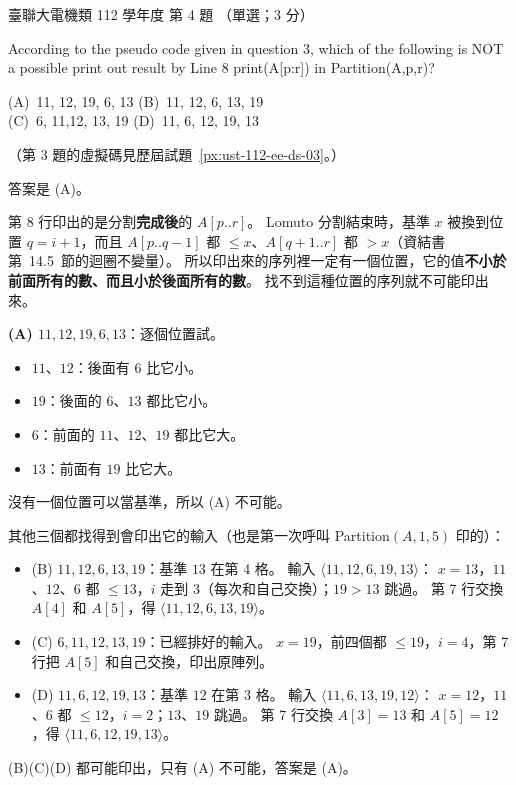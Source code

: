 \begin{pastexam}[label={px:ust-112-ee-ds-04}]{臺聯大電機類 112 學年度 第 4 題}
（單選；3 分）

According to the pseudo code given in question 3, which of the following is NOT a possible print
out result by Line 8 print(A[p:r]) in Partition(A,p,r)?

(A)~11, 12, 19, 6, 13 \qquad (B)~11, 12, 6, 13, 19\\
(C)~6, 11,12, 13, 19 \qquad (D)~11, 6, 12, 19, 13

（第 3 題的虛擬碼見歷屆試題~\ref{px:ust-112-ee-ds-03}。）
\end{pastexam}

\begin{pastsoln}
答案是 (A)。

第 8 行印出的是分割\textbf{完成後}的 $A[p..r]$。 Lomuto 分割結束時，基準 $x$ 被換到位置
$q = i + 1$，而且 $A[p..q-1]$ 都 $\le x$、$A[q+1..r]$ 都 $> x$（資結書第~14.5~節的迴圈不變量）。
所以印出來的序列裡一定有一個位置，它的值\textbf{不小於前面所有的數、而且小於後面所有的數}。
找不到這種位置的序列就不可能印出來。

\textbf{(A) $11, 12, 19, 6, 13$}：逐個位置試。
\begin{itemize}
\item $11$、$12$：後面有 $6$ 比它小。
\item $19$：後面的 $6$、$13$ 都比它小。
\item $6$：前面的 $11$、$12$、$19$ 都比它大。
\item $13$：前面有 $19$ 比它大。
\end{itemize}
沒有一個位置可以當基準，所以 (A) 不可能。

其他三個都找得到會印出它的輸入（也是第一次呼叫 Partition$(A, 1, 5)$ 印的）：
\begin{itemize}
\item (B) $11, 12, 6, 13, 19$：基準 $13$ 在第 4 格。 輸入 $\langle 11, 12, 6, 19, 13\rangle$：
$x = 13$，$11$、$12$、$6$ 都 $\le 13$，$i$ 走到 $3$（每次和自己交換）；$19 > 13$ 跳過。 第 7 行交換
$A[4]$ 和 $A[5]$，得 $\langle 11, 12, 6, 13, 19\rangle$。
\item (C) $6, 11, 12, 13, 19$：已經排好的輸入。 $x = 19$，前四個都 $\le 19$，$i = 4$，第 7 行把
$A[5]$ 和自己交換，印出原陣列。
\item (D) $11, 6, 12, 19, 13$：基準 $12$ 在第 3 格。 輸入 $\langle 11, 6, 13, 19, 12\rangle$：
$x = 12$，$11$、$6$ 都 $\le 12$，$i = 2$；$13$、$19$ 跳過。 第 7 行交換 $A[3] = 13$ 和
$A[5] = 12$，得 $\langle 11, 6, 12, 19, 13\rangle$。
\end{itemize}
(B)(C)(D) 都可能印出，只有 (A) 不可能，答案是 (A)。
\end{pastsoln}

